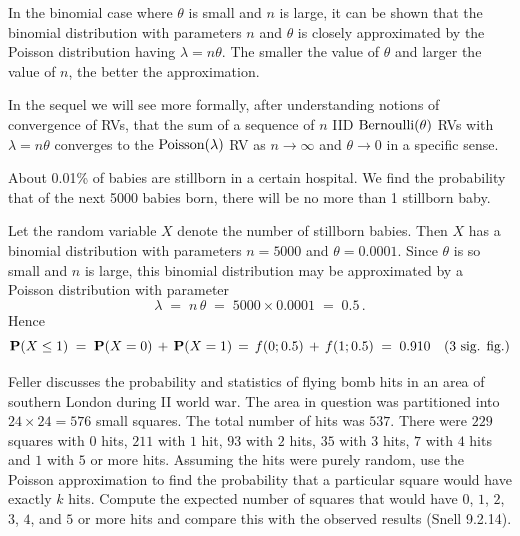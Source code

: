 \begin{rem}
In the binomial case where $\theta$ is small and $n$ is large, it can be shown that the
binomial distribution with parameters $n$ and $\theta$ is closely
approximated by the Poisson distribution having $\lambda = n \theta$. The
smaller the value of $\theta$ and larger the value of $n$, the better the approximation.

In the sequel we will see more formally, after understanding notions of convergence of RVs, that the sum of a sequence of $n$ IID $\mbox{{\rm Bernoulli}}(\theta)$ RVs with $\lambda = n \theta$ converges to the $\mbox{{\rm Poisson}}(\lambda)$ RV as $n \to \infty$ and $\theta \to 0$ in a specific sense.
\end{rem}

\begin{example}\label{Eg:still-born}
{ About 0.01\% of babies are stillborn in a certain hospital. We find the probability that of
  the next 5000 babies born, there will be no more than 1 stillborn baby.

  Let the random variable $X$ denote the number of
stillborn babies. Then $X$ has a binomial distribution with parameters
$n=5000$ and $\theta = 0.0001$.  Since $\theta$ is so small and $n$ is
large, this
binomial distribution may be approximated by a Poisson distribution
  with parameter
\[\lambda\;=\; n\,\theta\;=\; 5000 \times 0.0001 \;=\; 0.5\,. \]
Hence
 \[\mathbf{P}(X\leq 1)\;=\; \mathbf{P}(X=0)\,+\, \mathbf{P}(X=1)\,=\, f(0;0.5) \,+\, f(1;0.5)\;=\; 0.910 \quad (\text{3 sig. fig.})\]
}
\end{example}

\begin{Exercise}[title={Nazi Bombs on London},label={xbombsOnLondon}]
Feller discusses the probability and statistics of flying bomb hits in an area of southern London during II world war.  
The area in question was partitioned into $24 \times 24 = 576$ small squares.  
The total number of hits was $537$.  
There were $229$ squares with $0$ hits, $211$ with $1$ hit, $93$ with $2$ hits, $35$ with $3$ hits, $7$ with $4$ hits and $1$ with $5$ or more hits.  
Assuming the hits were purely random, use the Poisson approximation to find the probability that a particular square would have exactly $k$ hits.  Compute the expected number of squares that would have $0$, $1$, $2$, $3$, $4$, and $5$ or more hits and compare this with the observed results (Snell 9.2.14).  
\end{Exercise}

